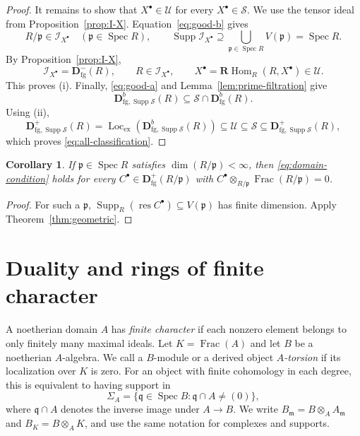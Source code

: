 \documentclass[11pt]{amsart}
\numberwithin{equation}{section}
\newtheorem{corollary}[theorem]{Corollary}
\theoremstyle{definition}
\theoremstyle{remark}
\DeclareMathOperator{\Supp}{Supp}
\DeclareMathOperator{\Spec}{Spec}
\DeclareMathOperator{\Loc}{Loc}
\DeclareMathOperator{\Hom}{Hom}
\DeclareMathOperator{\Frac}{Frac}
\DeclareMathOperator{\res}{res}
\newcommand{\RHom}{\mathbf R\!\Hom}
\newcommand{\D}{\mathbf D}
\newcommand{\fg}{\mathrm{fg}}
\newcommand{\Lex}{\Loc_{\mathrm{ex}}}
\newcommand{\p}{\mathfrak p}
\newcommand{\q}{\mathfrak q}
\newcommand{\m}{\mathfrak m}
\begin{document}
\begin{proof}
It remains to show that $X^\bullet\in\mathcal U$ for every
$X^\bullet\in\mathcal S$. We use the tensor ideal from
Proposition~\ref{prop:I-X}. Equation~\eqref{eq:good-b} gives
\[
 R/\p\in\mathcal I_{X^\bullet}\quad(\p\in\Spec R),\qquad
 \Supp\mathcal I_{X^\bullet}
    \supseteq\bigcup_{\p\in\Spec R}V(\p)=\Spec R.
\]
By Proposition~\ref{prop:I-X},
\[
 \mathcal I_{X^\bullet}=\D^-_{\fg}(R),\qquad
 R\in\mathcal I_{X^\bullet},\qquad
 X^\bullet=\RHom_R(R,X^\bullet)\in\mathcal U.
\]
This proves (i). Finally, \eqref{eq:good-a} and
Lemma~\ref{lem:prime-filtration} give
\[
 \D^b_{\fg,\Supp\mathcal S}(R)
       \subseteq\mathcal S\cap\D^b_{\fg}(R).
\]
Using (ii),
\[
 \D^+_{\fg,\Supp\mathcal S}(R)
   =\Lex(\D^b_{\fg,\Supp\mathcal S}(R))
   \subseteq\mathcal U\subseteq\mathcal S
   \subseteq\D^+_{\fg,\Supp\mathcal S}(R),
\]
which proves \eqref{eq:all-classification}.
\end{proof}

\begin{corollary}\label{cor:finite-torsion-test}
If $\p\in\Spec R$ satisfies $\dim(R/\p)<\infty$, then
\eqref{eq:domain-condition} holds for every
$C^{\bullet}\in\D^+_{\fg}(R/\p)$ with $C^{\bullet}\otimes_{R/\p}\Frac(R/\p)=0$.
\end{corollary}
\begin{proof}
For such a $\p$, $\Supp_R(\res C^{\bullet})\subseteq V(\p)$ has finite dimension.
Apply Theorem~\ref{thm:geometric}.
\end{proof}

\section{Duality and rings of finite character}\label{sec:infinite}

A noetherian domain $A$ has \emph{finite character} if each nonzero
element belongs to only finitely many maximal ideals. Let $K=\Frac(A)$
and let $B$ be a noetherian $A$-algebra. We call a $B$-module or a
derived object \emph{$A$-torsion} if its localization over $K$ is zero.
For an object with finite cohomology in each degree, this is equivalent
to having support in
\[
 \Sigma_A=\{\q\in\Spec B:\q\cap A\ne(0)\},
\]
where $\q\cap A$ denotes the inverse image under $A\to B$.
We write $B_\m=B\otimes_AA_\m$ and $B_K=B\otimes_AK$, and use the same
notation for complexes and supports.
\end{document}
